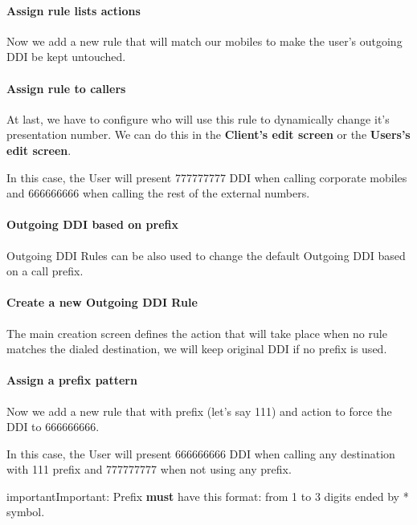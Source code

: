 \documentclass[letterpaper,10pt,english]{sphinxmanual}
\begin{document}
\paragraph{Assign rule lists actions}

Now we add a new rule that will match our mobiles to make the user's outgoing
DDI be kept untouched.
\paragraph{Assign rule to callers}

At last, we have to configure who will use this rule to dynamically change it's
presentation number. We can do this in the \textbf{Client's edit screen} or the
\textbf{Users's edit screen}.

In this case, the User will present 777777777 DDI when calling corporate mobiles
and 666666666 when calling the rest of the external numbers.


\paragraph{Outgoing DDI based on prefix}
\label{administration_portal/client/vpbx/user_configuration/outgoing_ddi_rules:outgoing-ddi-based-on-prefix}
Outgoing DDI Rules can be also used to change the default Outgoing DDI based on
a call prefix.
\paragraph{Create a new Outgoing DDI Rule}

The main creation screen defines the action that will take place when no rule
matches the dialed destination, we will keep original DDI if no prefix is used.
\paragraph{Assign a prefix pattern}

Now we add a new rule that with prefix (let's say 111) and action to force
the DDI to 666666666.

In this case, the User will present 666666666 DDI when calling any destination
with 111 prefix and 777777777 when not using any prefix.

\begin{notice}{important}{Important:}
Prefix \textbf{must} have this format: from 1 to 3 digits ended by * symbol.
\end{notice}
\end{document}
